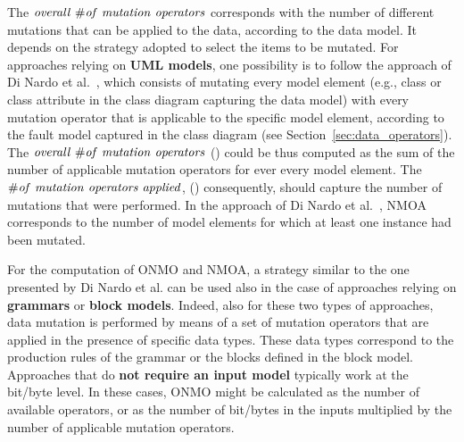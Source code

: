 The $\mathit{overall}\ \# \mathit{of}\ \mathit{mutation} \ \mathit{operators}$ corresponds with the number of different mutations that can be applied to the data, according to the data model. It depends on the strategy adopted to select the items to be mutated.
For approaches relying on \textbf{UML models}, one possibility is to follow the approach of Di Nardo et al.~\cite{di2015generating}, which consists of mutating every model element (e.g., class or class attribute in the class diagram capturing the data model) with every mutation operator that is applicable to the specific model element, according to the fault model captured in the class diagram (see Section~\ref{sec:data_operators}).
The $\mathit{overall}\ \# \mathit{of}\ \mathit{mutation} \ \mathit{operators}$ () could be thus computed as the sum of the number of applicable mutation operators for ever every model element.
The $\# \mathit{of}\ \mathit{mutation} \ \mathit{operators} \ \mathit{applied}$, () consequently, should capture the number of mutations that were performed. In the approach of Di Nardo et al.~\cite{di2015generating}, NMOA corresponds to the number of model elements for which at least one instance had been mutated. 

For the computation of ONMO and NMOA, a strategy similar to the one presented by Di Nardo et al. can be used also in the case of approaches relying on \textbf{grammars} or \textbf{block models}. Indeed, also for these two types of approaches, data mutation is performed by means of a set of mutation operators that are applied in the presence of specific data types. 
These data types correspond to the production rules of the grammar or the blocks defined in the block model. 
Approaches that do \textbf{not require an input model} typically work at the bit/byte level. In these cases, ONMO might be calculated as the number of available operators, or
as the number of bit/bytes in the inputs multiplied by the number of applicable mutation operators.

